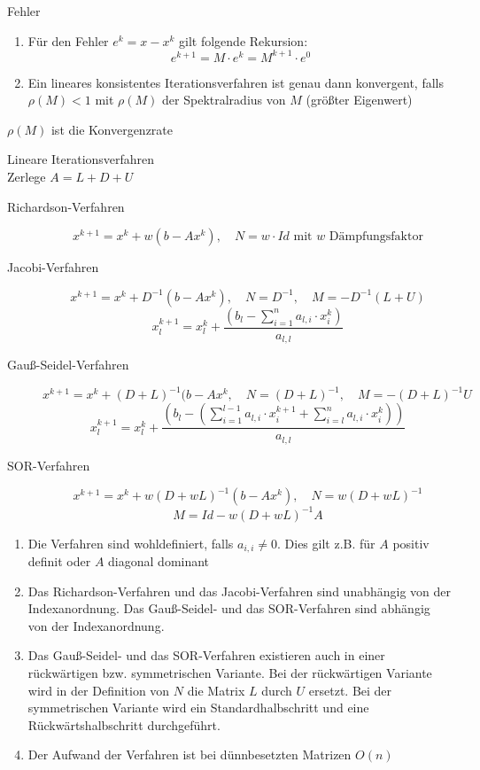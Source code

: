 \begin{theorem} Fehler
	\begin{enumerate}
		\item Für den Fehler $e^{k}=x-x^{k}$ gilt folgende Rekursion:
		$$e^{k+1}=M\cdot e^{k}=M^{k+1}\cdot e^{0}$$
		\item Ein lineares konsistentes Iterationsverfahren ist genau dann konvergent, falls $\rho(M)<1$ mit $\rho(M)$ der
		Spektralradius von $M$ (größter Eigenwert)
	\end{enumerate}
\end{theorem}
\begin{remark}
	$\rho(M)$  ist die Konvergenzrate
\end{remark}

\begin{definition}
	 Lineare Iterationsverfahren
	\\
	Zerlege $A=L+D+U$
	\begin{description}
		\item[Richardson-Verfahren]
			$$x^{k+1}=x^{k}+w(b-Ax^{k}),\quad N=w\cdot Id \text{ mit $w$ Dämpfungsfaktor}$$
		\item[Jacobi-Verfahren]
			$$x^{k+1}=x^{k} + D^{-1}(b-Ax^{k}),\quad N=D^{-1},\quad M=-D^{-1}(L+U)$$
			$$x_{l}^{k+1}=x_{l}^{k}+\frac{(b_{l}-\sum_{i=1}^{n}a_{l,i}\cdot x_{i}^{k})}{a_{l,l}}$$
		\item[Gauß-Seidel-Verfahren]
			$$x^{k+1}=x^{k}+(D+L)^{-1}(b-Ax^{k},\quad N=(D+L)^{-1},\quad M=-(D+L)^{-1}U$$
			$$x_{l}^{k+1}=x_{l}^{k}+\frac{(b_{l}-(\sum_{i=1}^{l-1}a_{l,i}\cdot x_{i}^{k+1} + \sum_{i=l}^{n}a_{l,i}\cdot x_{i}^{k}))}{a_{l,l}}$$
		\item[SOR-Verfahren]
			$$x^{k+1}=x^{k} + w(D+wL)^{-1}(b-Ax^{k}),\quad N=w(D+wL)^{-1}$$
			$$M=Id-w(D+wL)^{-1}A$$
	\end{description}
\end{definition}

\begin{remark}
	\begin{enumerate}
		\item Die Verfahren sind wohldefiniert, falls $a_{i,i}\not = 0$. Dies gilt z.B. für $A$ positiv definit oder $A$ diagonal dominant
		\item Das Richardson-Verfahren und das Jacobi-Verfahren sind unabhängig von der Indexanordnung. Das Gauß-Seidel- und das
		SOR-Verfahren sind abhängig von der Indexanordnung.
		\item Das Gauß-Seidel- und das SOR-Verfahren existieren auch in einer rückwärtigen bzw. symmetrischen Variante. Bei der 
		rückwärtigen Variante wird in der Definition von $N$ die Matrix $L$ durch $U$ ersetzt. Bei der symmetrischen Variante
		wird ein Standardhalbschritt und eine Rückwärtshalbschritt durchgeführt.
		\item Der Aufwand der Verfahren ist bei dünnbesetzten Matrizen $O(n)$ 
	\end{enumerate}
\end{remark}
